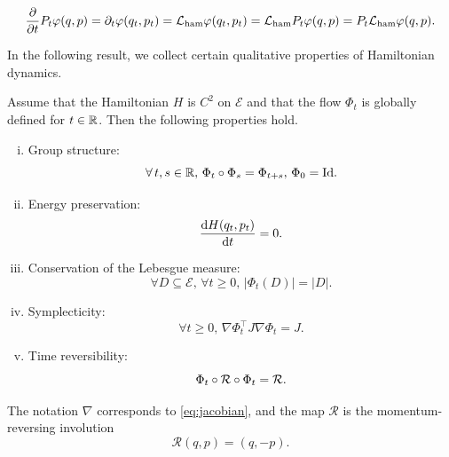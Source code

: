     $$ \frac \partial{\partial t} P_t \varphi (q,p)= \partial_t \varphi(q_t,p_t)= \mathcal{L}_{\rm ham} \varphi(q_t,p_t)=\mathcal{L}_{\rm ham} P_t \varphi(q,p)=P_t\mathcal{L}_{\rm ham} \varphi(q,p).$$
    
    In the following result, we collect certain qualitative properties of Hamiltonian dynamics.
    \begin{prop}
        \label{prop:hamiltonian_properties}
        Assume that the Hamiltonian $H$ is $C^2$ on $\mathcal E$ and that the flow $\Phi_t$ is globally defined for $t\in\mathbb{R}$. Then the following properties hold.
        \begin{enumerate}[i)]
            \item Group structure: \[\forall\, t,s\in \mathbb{R},\, \Phi_t \circ \Phi_s = \Phi_{t+s},\, \Phi_0=\mathrm{Id}.\]
            \item Energy preservation: \[\frac{\mathrm{d}H(q_t,p_t)}{\mathrm{d}t}=0.\]
            \item Conservation of the Lebesgue measure: \[\forall D\subseteq \mathcal{E},\,\forall t\geq 0,\,|\Phi_t(D)|=|D|.\]
            \item Symplecticity: \[\forall t\geq 0,\,\nabla \Phi_t^\intercal J \nabla \Phi_t = J.\]
            \item Time reversibility: \[\Phi_t \circ \mathcal{R} \circ \Phi_t=\mathcal R.\]
        \end{enumerate}
        The notation $\nabla$ corresponds to \eqref{eq:jacobian}, and the map $\mathcal R$ is the momentum-reversing involution
        \[\mathcal R(q,p)=(q,-p).\]
    \end{prop}
